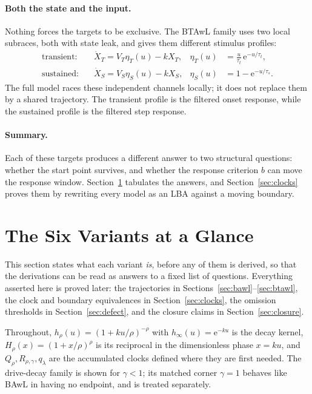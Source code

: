 \documentclass[12pt]{article}
\newcommand{\e}{\mathrm{e}}
\theoremstyle{remark}
\begin{document}
\paragraph{Both the state and the input.} Nothing forces the targets to be
exclusive.  The BTAwL family uses two local subraces, both with state leak, and gives them different stimulus profiles:
\begin{equation}
  \begin{aligned}
  \text{transient:}\quad&
    \dot X_T=V_T\eta_T(u)-kX_T,
    &\eta_T(u)&=\frac{u}{\tau_t}\,\e^{-u/\tau_t},\\
  \text{sustained:}\quad&
    \dot X_S=V_S\eta_S(u)-kX_S,
    &\eta_S(u)&=1-\e^{-u/\tau_s}.
  \end{aligned}
  \label{eq:btawl-intro}
\end{equation}
The full model races these independent channels locally; it does not replace them by a shared trajectory.  The transient profile is the filtered onset response, while the sustained profile is the filtered step response.

\paragraph{Summary.} Each of these targets produces a different answer to
two structural questions: whether the start point survives, and whether the response criterion $b$ can move the response window. Section~\ref{sec:glance} tabulates the answers, and Section~\ref{sec:clocks} proves them by rewriting every model as an LBA against a moving boundary.

\section{The Six Variants at a Glance}
\label{sec:glance}
This section states what each variant \emph{is}, before any of them is derived, so that the derivations can be read as answers to a fixed list of questions. Everything asserted here is proved later: the trajectories in Sections~\ref{sec:bawl}--\ref{sec:btawl}, the clock and boundary equivalences in Section~\ref{sec:clocks}, the omission thresholds in Section~\ref{sec:defect}, and the closure claims in Section~\ref{sec:closure}.

Throughout, $h_\rho(u)=(1+ku/\rho)^{-\rho}$ with $h_\infty(u)=\e^{-ku}$ is the decay kernel, $H_\rho(x)=(1+x/\rho)^{\rho}$ is its reciprocal in the dimensionless phase $x=ku$, and $Q_\rho,R_{\rho,\gamma},q_\lambda$ are the accumulated clocks defined where they are first needed. The drive-decay family is shown for $\gamma<1$; its matched corner $\gamma=1$ behaves like BAwL in having no endpoint, and is treated separately.
\end{document}
